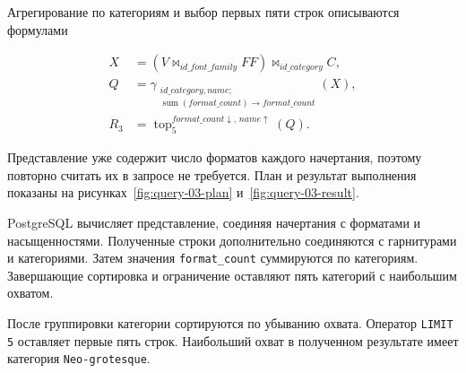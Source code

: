 
Агрегирование по категориям и выбор первых пяти строк описываются формулами

\[
\begin{aligned}
X &= \left(V \bowtie_{id\_font\_family} FF\right)
    \bowtie_{id\_category} C,\\
Q &= \gamma_{\substack{id\_category,name;\\
\operatorname{sum}(format\_count) \rightarrow format\_count}}
(X),\\
R_3 &= \operatorname{top}_{5}^{format\_count\downarrow,\,name\uparrow}(Q).
\end{aligned}
\]

Представление уже содержит число форматов каждого начертания, поэтому повторно
считать их в запросе не требуется. План и результат выполнения показаны на
рисунках~\ref{fig:query-03-plan} и~\ref{fig:query-03-result}.


PostgreSQL вычисляет представление, соединяя начертания с форматами и
насыщенностями. Полученные строки дополнительно соединяются с гарнитурами и
категориями. Затем значения \texttt{format_count} суммируются по
категориям. Завершающие сортировка и ограничение оставляют пять категорий с
наибольшим охватом.


После группировки категории сортируются по убыванию охвата. Оператор
\texttt{LIMIT 5} оставляет первые пять строк. Наибольший охват в
полученном результате имеет категория \texttt{Neo-grotesque}.
